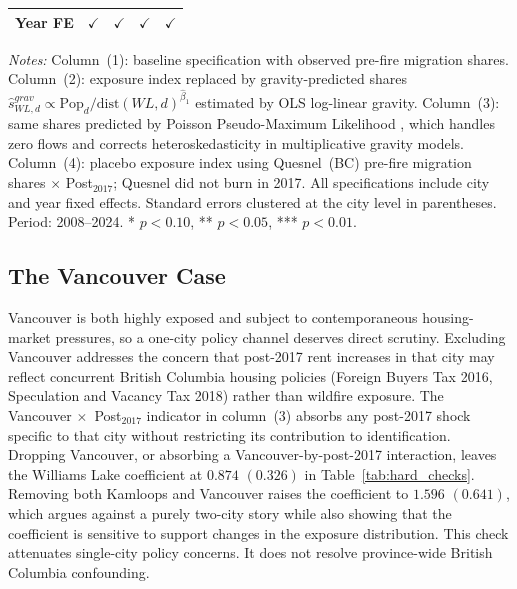 \documentclass[12pt]{article}
\begin{document}
\begin{table}[htbp]
{\begin{threeparttable}
\begin{tabular}{lcccc}
      Year FE                           & $\checkmark$  & $\checkmark$  & $\checkmark$  & $\checkmark$ \\
      \bottomrule
    \end{tabular}
    \begin{tablenotes}[flushleft]\footnotesize{}
      \item \textit{Notes:} Column~(1): baseline specification with observed pre-fire migration shares.
        Column~(2): exposure index replaced by gravity-predicted shares
        $\hat{s}_{WL,d}^{grav} \propto \mathrm{Pop}_d / \mathrm{dist}(WL,d)^{\hat{\beta}_1}$
        estimated by OLS log-linear gravity.
        Column~(3): same shares predicted by Poisson Pseudo-Maximum Likelihood
        \citep{santossilva2006}, which handles zero flows and corrects
        heteroskedasticity in multiplicative gravity models.
        Column~(4): placebo exposure index using Quesnel~(BC) pre-fire migration
        shares $\times$ Post$_{2017}$; Quesnel did not burn in 2017.
        All specifications include city and year fixed effects.
        Standard errors clustered at the city level in parentheses.
        Period: 2008--2024.
        * $p < 0.10$, ** $p < 0.05$, *** $p < 0.01$.
    \end{tablenotes}
  \end{threeparttable}}
\end{table}

\subsection{The Vancouver Case}
\label{sec:vancouver_checks}

Vancouver is both highly exposed and subject to contemporaneous housing-market
pressures, so a one-city policy channel deserves direct scrutiny. Excluding
Vancouver addresses the concern that post-2017 rent increases in that city may
reflect concurrent British Columbia housing policies (Foreign Buyers Tax 2016, Speculation
and Vacancy Tax 2018) rather than wildfire exposure. The Vancouver
$\times$~Post$_{2017}$ indicator in column~(3) absorbs any post-2017 shock
specific to that city without restricting its contribution to identification.
Dropping Vancouver, or absorbing a Vancouver-by-post-2017 interaction, leaves
the Williams Lake coefficient at $0.874$ $(0.326)$ in
Table~\ref{tab:hard_checks}. Removing both Kamloops and Vancouver raises the
coefficient to $1.596$ $(0.641)$, which argues against a purely two-city story
while also showing that the coefficient is sensitive to support changes in the
exposure distribution. This check attenuates single-city policy concerns. It does
not resolve province-wide British Columbia confounding.
\end{document}
